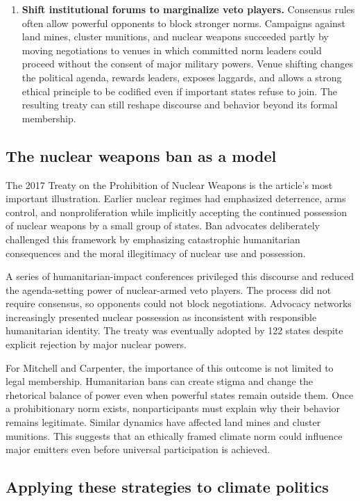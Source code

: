 \begin{enumerate}
    \item \textbf{Shift institutional forums to marginalize veto players.} Consensus rules often allow powerful opponents to block stronger norms. Campaigns against land mines, cluster munitions, and nuclear weapons succeeded partly by moving negotiations to venues in which committed norm leaders could proceed without the consent of major military powers. Venue shifting changes the political agenda, rewards leaders, exposes laggards, and allows a strong ethical principle to be codified even if important states refuse to join. The resulting treaty can still reshape discourse and behavior beyond its formal membership.
\end{enumerate}

\subsection{The nuclear weapons ban as a model}

The 2017 Treaty on the Prohibition of Nuclear Weapons is the article's most important illustration. Earlier nuclear regimes had emphasized deterrence, arms control, and nonproliferation while implicitly accepting the continued possession of nuclear weapons by a small group of states. Ban advocates deliberately challenged this framework by emphasizing catastrophic humanitarian consequences and the moral illegitimacy of nuclear use and possession.

A series of humanitarian-impact conferences privileged this discourse and reduced the agenda-setting power of nuclear-armed veto players. The process did not require consensus, so opponents could not block negotiations. Advocacy networks increasingly presented nuclear possession as inconsistent with responsible humanitarian identity. The treaty was eventually adopted by 122 states despite explicit rejection by major nuclear powers.

For Mitchell and Carpenter, the importance of this outcome is not limited to legal membership. Humanitarian bans can create stigma and change the rhetorical balance of power even when powerful states remain outside them. Once a prohibitionary norm exists, nonparticipants must explain why their behavior remains legitimate. Similar dynamics have affected land mines and cluster munitions. This suggests that an ethically framed climate norm could influence major emitters even before universal participation is achieved.

\subsection{Applying these strategies to climate politics}


